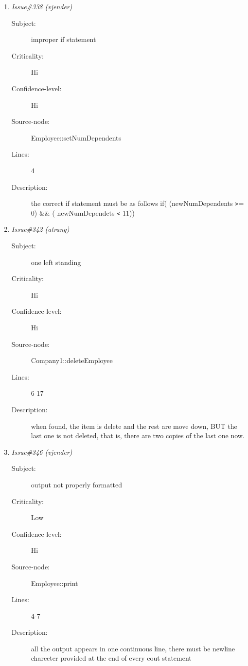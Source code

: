 \begin{enumerate}
\begin{description}
\item [Lines:] 4

\item [Description:] the correct statment must be as follows
if((newAge {\tt >}=17) \&\& (newAge {\tt <}= 55)
\end{description}
\item {\it Issue\#338 (vjender)}
\begin{description}
\item [Subject:] improper if statement
\item [Criticality:] Hi
\item [Confidence-level:] Hi
\item [Source-node:] Employee::setNumDependents

\item [Lines:] 4

\item [Description:] the correct if statement must be as follows
if( (newNumDependents {\tt >}= 0) \&\& ( newNumDependets {\tt <} 11))
\end{description}
\item {\it Issue\#342 (atrang)}
\begin{description}
\item [Subject:] one left standing
\item [Criticality:] Hi
\item [Confidence-level:] Hi
\item [Source-node:] Company1::deleteEmployee

\item [Lines:] 6-17

\item [Description:] when found, the item is delete and the rest are move down, BUT the last one
is not deleted, that is, there are two copies of the last one now.
\end{description}
\item {\it Issue\#346 (vjender)}
\begin{description}
\item [Subject:] output not properly formatted
\item [Criticality:] Low
\item [Confidence-level:] Hi
\item [Source-node:] Employee::print

\item [Lines:] 4-7

\item [Description:] all the output appears in one continuous
line, there must be newline charecter provided at the end of every cout
statement


\end{description}
\end{enumerate}
